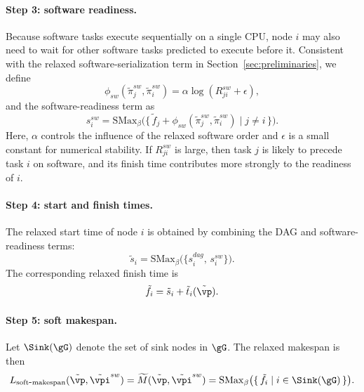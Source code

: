 \paragraph{\textbf{Step 3: software readiness.}}
Because software tasks execute sequentially on a single CPU, node $i$ may also need to wait for other software tasks predicted to execute before it. Consistent with the relaxed software-serialization term in Section~\ref{sec:preliminaries}, we define
\begin{equation}
\phi_{sw}(\tilde{\pi}_j^{sw},\tilde{\pi}_i^{sw})
=
\alpha \log(R^{sw}_{ji}+\epsilon),
\end{equation}
and the software-readiness term as
\begin{equation}
s_i^{sw}
=
\mathrm{SMax}_{\beta}
\Big(
\{\, \tilde{f}_j + \phi_{sw}(\tilde{\pi}_j^{sw},\tilde{\pi}_i^{sw}) \mid j \neq i\,\}
\Big).
\end{equation}
Here, $\alpha$ controls the influence of the relaxed software order and $\epsilon$ is a small constant for numerical stability. If $R^{sw}_{ji}$ is large, then task $j$ is likely to precede task $i$ on software, and its finish time contributes more strongly to the readiness of $i$.

\paragraph{\textbf{Step 4: start and finish times.}}
The relaxed start time of node $i$ is obtained by combining the DAG and software-readiness terms:
\begin{equation}
\tilde{s}_i = \mathrm{SMax}_{\beta}\big(\{s_i^{dag},\, s_i^{sw}\}\big).
\end{equation}
The corresponding relaxed finish time is
\begin{equation}
\tilde{f}_i = \tilde{s}_i + \tilde{t}_i(\tilde{\vp}).
\end{equation}

\paragraph{\textbf{Step 5: soft makespan.}}
Let $\Sink(\gG)$ denote the set of sink nodes in $\gG$. The relaxed makespan is then
\begin{equation}
L_{\mathrm{soft\mbox{-}makespan}}(\tilde{\vp},\tilde{\vpi}^{sw})
=
\widetilde{M}(\tilde{\vp},\tilde{\vpi}^{sw})
=
\mathrm{SMax}_{\beta}\big(\{\, \tilde{f}_i \mid i \in \Sink(\gG)\,\}\big).
\end{equation}

